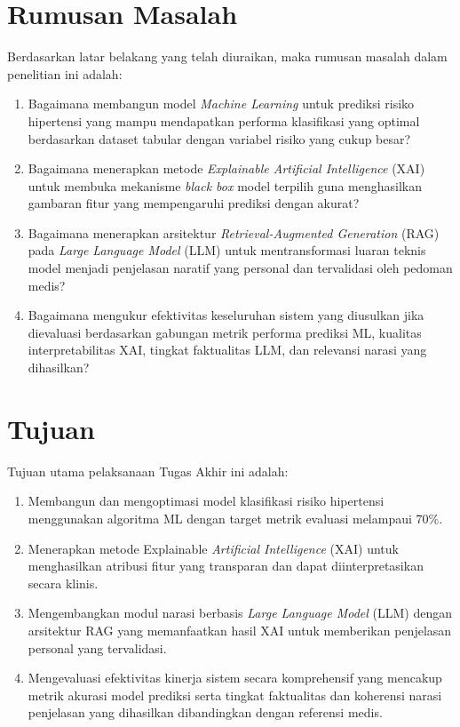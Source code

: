 \section{Rumusan Masalah}
Berdasarkan latar belakang yang telah diuraikan, maka rumusan masalah dalam penelitian ini adalah:
\begin{enumerate}
    \item Bagaimana membangun model \textit{Machine Learning} untuk prediksi risiko hipertensi yang mampu mendapatkan performa klasifikasi yang optimal berdasarkan dataset tabular dengan variabel risiko yang cukup besar?
    \item Bagaimana menerapkan metode \textit{Explainable Artificial Intelligence} (XAI) untuk membuka mekanisme \textit{black box} model terpilih guna menghasilkan gambaran fitur yang mempengaruhi prediksi dengan akurat?
    \item Bagaimana menerapkan arsitektur \textit{Retrieval-Augmented Generation} (RAG) pada \textit{Large Language Model} (LLM) untuk mentransformasi luaran teknis model menjadi penjelasan naratif yang personal dan tervalidasi oleh pedoman medis?
    \item Bagaimana mengukur efektivitas keseluruhan sistem yang diusulkan jika dievaluasi berdasarkan gabungan metrik performa prediksi ML, kualitas interpretabilitas XAI, tingkat faktualitas LLM, dan relevansi narasi yang dihasilkan?
\end{enumerate}

\section{Tujuan}
Tujuan utama pelaksanaan Tugas Akhir ini adalah:
\begin{enumerate}
    \item Membangun dan mengoptimasi model klasifikasi risiko hipertensi menggunakan algoritma ML dengan target metrik evaluasi melampaui 70\%.
    \item Menerapkan metode Explainable \textit{Artificial Intelligence} (XAI) untuk menghasilkan atribusi fitur yang transparan dan dapat diinterpretasikan secara klinis.
    \item Mengembangkan modul narasi berbasis \textit{Large Language Model} (LLM) dengan arsitektur RAG yang memanfaatkan hasil XAI untuk memberikan penjelasan personal yang tervalidasi.
    \item Mengevaluasi efektivitas kinerja sistem secara komprehensif yang mencakup metrik akurasi model prediksi serta tingkat faktualitas dan koherensi narasi penjelasan yang dihasilkan dibandingkan dengan referensi medis.
\end{enumerate}

